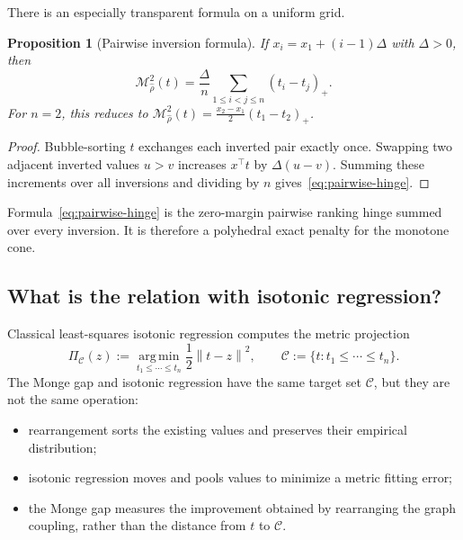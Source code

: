 \documentclass[11pt,a4paper]{article}
\newtheorem{proposition}[theorem]{Proposition}
\theoremstyle{definition}
\theoremstyle{remark}
\newcommand{\Mcal}{\mathcal M}
\newcommand{\argmin}{\operatorname*{arg\,min}}
\newcommand{\norm}[1]{\left\lVert #1\right\rVert}
\begin{document}
There is an especially transparent formula on a uniform grid.

\begin{proposition}[Pairwise inversion formula]\label{prop:pairwise-hinge}
If $x_i=x_1+(i-1)\Delta$ with $\Delta>0$, then
\begin{equation}\label{eq:pairwise-hinge}
  \Mcal_{\widehat\rho}^2(t)
  =\frac{\Delta}{n}
    \sum_{1\leq i<j\leq n}(t_i-t_j)_+.
\end{equation}
For $n=2$, this reduces to
$\Mcal_{\widehat\rho}^2(t)=\tfrac{x_2-x_1}{2}(t_1-t_2)_+$.
\end{proposition}

\begin{proof}
Bubble-sorting $t$ exchanges each inverted pair exactly once. Swapping two
adjacent inverted values $u>v$ increases $x^\top t$ by
$\Delta(u-v)$. Summing these increments over all inversions and dividing by
$n$ gives~\eqref{eq:pairwise-hinge}.
\end{proof}

Formula~\eqref{eq:pairwise-hinge} is the zero-margin pairwise ranking hinge
summed over every inversion. It is therefore a polyhedral exact penalty for
the monotone cone.

\subsection{What is the relation with isotonic regression?}

Classical least-squares isotonic regression computes the metric projection
\begin{equation}\label{eq:isotonic-regression}
  \Pi_{\mathcal C}(z)
  :=\argmin_{t_1\leq\cdots\leq t_n}\frac12\norm{t-z}^2,
  \qquad
  \mathcal C:=\{t:t_1\leq\cdots\leq t_n\}.
\end{equation}
The Monge gap and isotonic regression have the same target set
$\mathcal C$, but they are not the same operation:
\begin{itemize}
  \item rearrangement sorts the existing values and preserves their empirical
    distribution;
  \item isotonic regression moves and pools values to minimize a metric
    fitting error;
  \item the Monge gap measures the improvement obtained by rearranging the
    graph coupling, rather than the distance from $t$ to $\mathcal C$.
\end{itemize}
\end{document}
